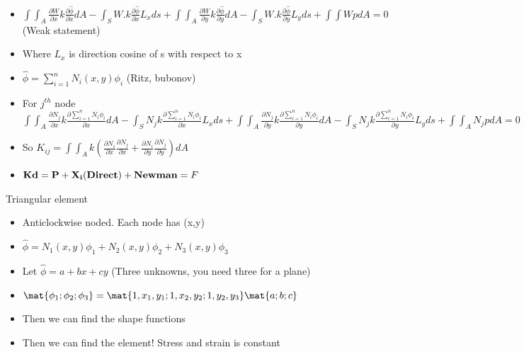 	\begin{frame}
		\begin{itemize}
			\item $\int \int_A  \frac{\partial W}{\partial x} k\frac{\partial \hat{\phi}}{\partial x} dA - \int_S W.k \frac{\partial \hat{\phi}}{\partial x} L_x ds + \int \int_A  \frac{\partial W}{\partial y} k\frac{\partial \hat{\phi}}{\partial y} dA - \int_S W.k \frac{\partial \hat{\phi}}{\partial y} L_y ds + \int \int W p dA = 0 $ (Weak statement)
			\item Where $L_x$ is direction cosine of s with respect to x
			\item $\hat{\phi} = \sum_{i=1}^{n}N_i(x,y)\phi_i$ (Ritz, bubonov)
			\item For $j^{th}$ node \\             $\int\int _A \frac{\partial N_j}{\partial x} k \frac{\partial \sum_{i=1}^{n} N_i \phi_i}{\partial x} dA - \int_S N_j k \frac{\partial \sum_{i=1}^{n} N_i \phi_i}{\partial x} L_x ds +
			\int\int _A \frac{\partial N_j}{\partial y} k \frac{\partial \sum_{i=1}^{n} N_i \phi_i}{\partial y} dA - \int_S N_j k \frac{\partial \sum_{i=1}^{n} N_i \phi_i}{\partial y} L_y ds + \int \int_A N_j p dA= 0 $
			\item So $K_{ij} = \int\int_A k \left( \frac{\partial N_i}{\partial x}\frac{\partial N_j}{\partial x} + \frac{\partial N_i}{\partial y}\frac{\partial N_j}{\partial y}\right)dA$
			\item $\mathbf{K  d= P + X_i (Direct)+ Newman } = F$	
	\end{itemize}
	\end{frame}



	\begin{frame}{Triangular element}
		\begin{itemize}
			\item Anticlockwise noded. Each node has (x,y)
			\item $\hat{\phi} = N_1(x,y)\phi_1+N_2(x,y)\phi_2+N_3(x,y)\phi_3$
			\item Let $\hat{\phi} = a + bx + cy$ (Three unknowns, you need three for a plane)
			\item $\mat{\phi_1;\phi_2;\phi_3} = \mat{1,x_1,y_1;1,x_2,y_2;1,y_2,y_3} \mat{a;b;c}$
			\item Then we can find the shape functions
			\item Then we can find the element! Stress and strain is constant
		\end{itemize}
	\end{frame}



